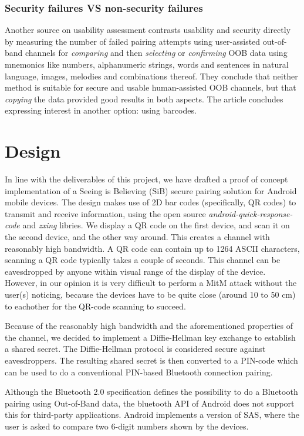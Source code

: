 \documentclass[conference, 11pt]{sty/IEEEtran}
\begin{document}
\subsubsection{Security failures VS non-security failures}
Another source on usability assessment contrasts usability and security directly~\cite{kainda2009usability} by measuring the number of failed pairing attempts using user-assisted out-of-band channels for \textit{comparing} and then \textit{selecting} or \textit{confirming} OOB data using mnemonics like numbers, alphanumeric strings, words and sentences in natural language, images, melodies and combinations thereof.
They conclude that neither method is suitable for secure and usable human-assisted OOB channels, but that \textit{copying} the data provided good results in both aspects.
The article concludes expressing interest in another option: using barcodes.

\section{Design}
\label{sec:design}
In line with the deliverables of this project, we have drafted a proof of concept implementation of a Seeing is Believing (SiB) secure pairing solution for Android mobile devices.
The design makes use of 2D bar codes (specifically, QR codes) to transmit and receive information, using the open source \textit{android-quick-response-code}\cite{aqrc} and \textit{zxing}\cite{zxing} libries.
We display a QR code on the first device, and scan it on the second device, and the other way around.
This creates a channel with reasonably high bandwidth.
A QR code can contain up to 1264 ASCII characters, scanning a QR code typically takes a couple of seconds. 
This channel can be eavesdropped by anyone within visual range of the display of the device.
However, in our opinion it is very difficult to perform a MitM attack without the user(s) noticing, because the devices have to be quite close (around 10 to 50 cm) to eachother for the QR-code scanning to succeed.

Because of the reasonably high bandwidth and the aforementioned properties of the channel, we decided to implement a Diffie-Hellman key exchange to establish a shared secret. The Diffie-Hellman protocol is considered secure against eavesdroppers.
The resulting shared secret is then converted to a PIN-code which can be used to do a conventional PIN-based Bluetooth connection pairing.

Although the Bluetooth 2.0 specification defines the possibility to do a Bluetooth pairing using Out-of-Band data, the bluetooth API of Android does not support this for third-party applications. Android implements a version of SAS, where the user is asked to compare two 6-digit numbers shown by the devices.
\end{document}
